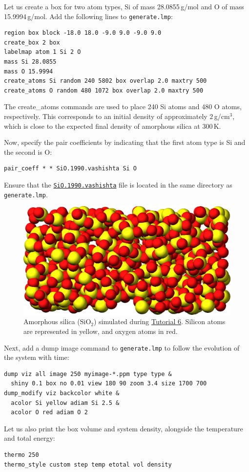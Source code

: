 \documentclass[9pt,tutorial]{livecoms}
\newcommand{\lmpcmd}[1]{\hspace{0pt}\colorbox{listing}{\textcolor{command}{\small{#1}}}\hspace{0pt}} %
\newcommand{\flecmd}[1]{\textcolor{command}{\texttt{#1}}} %
\newcommand{\dwlcmd}[1]{\textcolor{download}{\texttt{#1}}} %
\newcommand{\filepath}{https://raw.githubusercontent.com/lammpstutorials/lammpstutorials-article/main/files/}
\begin{document}
Let us create a box for two atom types, \lmpcmd{Si}
of mass 28.0855\,g/mol and \lmpcmd{O} of mass 15.9994\,g/mol.
Add the following lines to \flecmd{generate.lmp}:
\begin{lstlisting}
region box block -18.0 18.0 -9.0 9.0 -9.0 9.0
create_box 2 box
labelmap atom 1 Si 2 O
mass Si 28.0855
mass O 15.9994
create_atoms Si random 240 5802 box overlap 2.0 maxtry 500
create_atoms O random 480 1072 box overlap 2.0 maxtry 500
\end{lstlisting}
The \lmpcmd{create\_atoms} commands are used to place
240 Si atoms and 480 O atoms, respectively.  This corresponds to
an initial density of approximately $2$\,g/cm$^3$, which is close
to the expected final density of amorphous silica at 300\,K.

Now, specify the pair coefficients by indicating that the first atom type
is \lmpcmd{Si} and the second is \lmpcmd{O}:
\begin{lstlisting}
pair_coeff * * SiO.1990.vashishta Si O
\end{lstlisting}
Ensure that the \href{\filepath tutorial6/SiO.1990.vashishta}{\dwlcmd{SiO.1990.vashishta}}
file is located in the same directory as \flecmd{generate.lmp}.

\begin{figure}
\centering
\includegraphics[width=0.9\linewidth]{GCMC-generate}
\caption{Amorphous silica ($\text{SiO}_2$) simulated
during \hyperref[gcmc-silica-label]{Tutorial 6}.  Silicon atoms are
represented in yellow, and oxygen atoms in red.}
\label{fig:GCMC-snapshot}
\end{figure}

Next, add a \lmpcmd{dump image} command to \flecmd{generate.lmp} to follow the
evolution of the system with time:
\begin{lstlisting}
dump viz all image 250 myimage-*.ppm type type &
  shiny 0.1 box no 0.01 view 180 90 zoom 3.4 size 1700 700
dump_modify viz backcolor white &
  acolor Si yellow adiam Si 2.5 &
  acolor O red adiam O 2
\end{lstlisting}
Let us also print the box volume and system density, alongside the
temperature and total energy:
\begin{lstlisting}
thermo 250
thermo_style custom step temp etotal vol density
\end{lstlisting}
\end{document}
